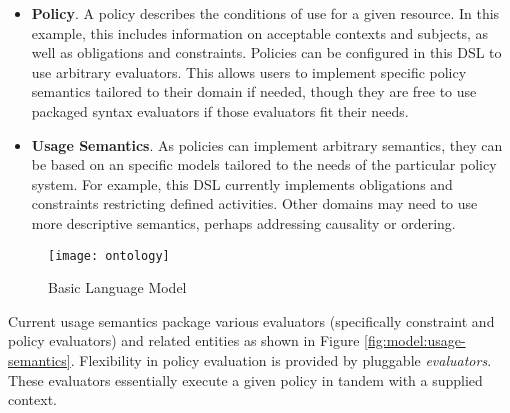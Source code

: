 \begin{itemize}
\begin{itemize}
\end{itemize}
\item \textbf{Policy}.  A policy describes the conditions of use for a given resource.  In this example, this includes information on acceptable contexts and subjects, as well as obligations and constraints.  Policies can be configured in this DSL to use arbitrary evaluators.  This allows users to implement specific policy semantics tailored to their domain if needed, though they are free to use packaged syntax evaluators if those evaluators fit their needs. 
\item \textbf{Usage Semantics}.  As policies can implement arbitrary semantics, they can be based on an specific models tailored to the needs of the particular policy system.  For example, this DSL currently implements obligations and constraints restricting defined activities.  Other domains may need to use more descriptive semantics, perhaps addressing causality or ordering.
\end{itemize}

\begin{figure}[!t]
\centering
\texttt{[image: ontology]}
\caption{Basic Language Model}
\label{fig:model:ontology}
\end{figure}

Current usage semantics package various evaluators (specifically constraint and policy evaluators) and related entities as shown in Figure \ref{fig:model:usage-semantics}. Flexibility in policy evaluation is provided by pluggable \emph{evaluators}.  These evaluators essentially execute a given policy in tandem with a supplied context.

